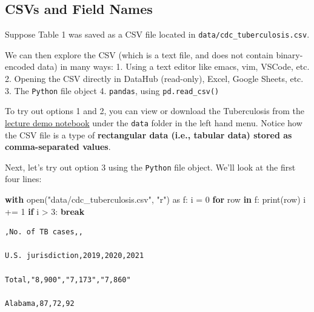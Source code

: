 \documentclass[
  letterpaper,
  DIV=11,
  numbers=noendperiod]{scrreprt}
\newenvironment{Shaded}{\begin{snugshade}}{\end{snugshade}}
\newcommand{\BuiltInTok}[1]{\textcolor[rgb]{0.00,0.23,0.31}{#1}}
\newcommand{\ControlFlowTok}[1]{\textcolor[rgb]{0.00,0.23,0.31}{\textbf{#1}}}
\newcommand{\DecValTok}[1]{\textcolor[rgb]{0.68,0.00,0.00}{#1}}
\newcommand{\ImportTok}[1]{\textcolor[rgb]{0.00,0.46,0.62}{#1}}
\newcommand{\KeywordTok}[1]{\textcolor[rgb]{0.00,0.23,0.31}{\textbf{#1}}}
\newcommand{\NormalTok}[1]{\textcolor[rgb]{0.00,0.23,0.31}{#1}}
\newcommand{\OperatorTok}[1]{\textcolor[rgb]{0.37,0.37,0.37}{#1}}
\newcommand{\StringTok}[1]{\textcolor[rgb]{0.13,0.47,0.30}{#1}}
\begin{document}
\subsection{CSVs and Field Names}\label{csvs-and-field-names}

Suppose Table 1 was saved as a CSV file located in
\texttt{data/cdc\_tuberculosis.csv}.

We can then explore the CSV (which is a text file, and does not contain
binary-encoded data) in many ways: 1. Using a text editor like emacs,
vim, VSCode, etc. 2. Opening the CSV directly in DataHub (read-only),
Excel, Google Sheets, etc. 3. The \texttt{Python} file object 4.
\texttt{pandas}, using \texttt{pd.read\_csv()}

To try out options 1 and 2, you can view or download the Tuberculosis
from the
\href{https://data100.datahub.berkeley.edu/hub/user-redirect/git-pull?repo=https\%3A\%2F\%2Fgithub.com\%2FDS-100\%2Fsp25-student&urlpath=lab\%2Ftree\%2Fsp25-student\%2Flecture\%2Flec05\%2Flec05-part-1-eda-tuberculosis.ipynb&branch=main}{lecture
demo notebook} under the \texttt{data} folder in the left hand menu.
Notice how the CSV file is a type of \textbf{rectangular data (i.e.,
tabular data) stored as comma-separated values}.

Next, let's try out option 3 using the \texttt{Python} file object.
We'll look at the first four lines:

\begin{Shaded}
\begin{Highlighting}[]
\ControlFlowTok{with} \BuiltInTok{open}\NormalTok{(}\StringTok{"data/cdc\_tuberculosis.csv"}\NormalTok{, }\StringTok{"r"}\NormalTok{) }\ImportTok{as}\NormalTok{ f:}
\NormalTok{    i }\OperatorTok{=} \DecValTok{0}
    \ControlFlowTok{for}\NormalTok{ row }\KeywordTok{in}\NormalTok{ f:}
        \BuiltInTok{print}\NormalTok{(row)}
\NormalTok{        i }\OperatorTok{+=} \DecValTok{1}
        \ControlFlowTok{if}\NormalTok{ i }\OperatorTok{\textgreater{}} \DecValTok{3}\NormalTok{:}
            \ControlFlowTok{break}
\end{Highlighting}
\end{Shaded}

\begin{verbatim}
,No. of TB cases,,

U.S. jurisdiction,2019,2020,2021

Total,"8,900","7,173","7,860"

Alabama,87,72,92
\end{verbatim}
\end{document}
